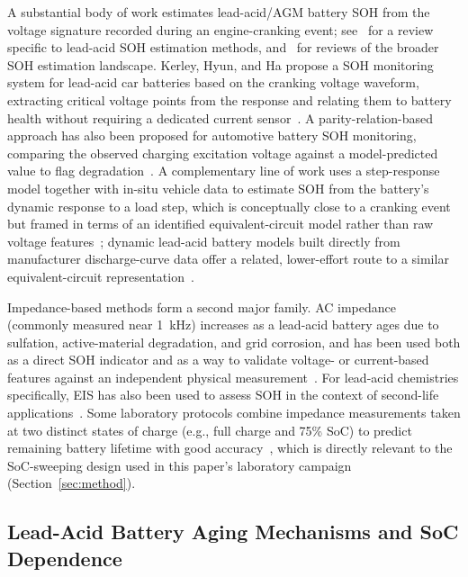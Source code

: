 \documentclass[conference]{IEEEtran}
\begin{document}
A substantial body of work estimates lead-acid/AGM battery SOH from the voltage signature recorded during an engine-cranking event; see~\cite{jiangReviewStateHealth2022} for a review specific to lead-acid SOH estimation methods, and~\cite{nouraReviewBatteryState2020,kimBatteryStateHealth2025} for reviews of the broader SOH estimation landscape. Kerley, Hyun, and Ha propose a SOH monitoring system for lead-acid car batteries based on the cranking voltage waveform, extracting critical voltage points from the response and relating them to battery health without requiring a dedicated current sensor~\cite{kerleyAutomotiveLeadacidBattery2015}. A parity-relation-based approach has also been proposed for automotive battery SOH monitoring, comparing the observed charging excitation voltage against a model-predicted value to flag degradation~\cite{zhangAutomotiveBatteryStateofhealth2012}. A complementary line of work uses a step-response model together with in-situ vehicle data to estimate SOH from the battery's dynamic response to a load step, which is conceptually close to a cranking event but framed in terms of an identified equivalent-circuit model rather than raw voltage features~\cite{stepresponse_soh}; dynamic lead-acid battery models built directly from manufacturer discharge-curve data offer a related, lower-effort route to a similar equivalent-circuit representation~\cite{medoraDynamicBatteryModeling2005}.

Impedance-based methods form a second major family. AC impedance (commonly measured near 1~kHz) increases as a lead-acid battery ages due to sulfation, active-material degradation, and grid corrosion, and has been used both as a direct SOH indicator and as a way to validate voltage- or current-based features against an independent physical measurement~\cite{lead_acid_impedance_aging,eis_soh_timedep,tairovImpedanceMeasurementsBattery2011}. For lead-acid chemistries specifically, EIS has also been used to assess SOH in the context of second-life applications~\cite{mohsinNewLeadacidBattery2022}. Some laboratory protocols combine impedance measurements taken at two distinct states of charge (e.g., full charge and 75\% SoC) to predict remaining battery lifetime with good accuracy~\cite{eis_soh_timedep}, which is directly relevant to the SoC-sweeping design used in this paper's laboratory campaign (Section~\ref{sec:method}).

\subsection{Lead-Acid Battery Aging Mechanisms and SoC Dependence}
\end{document}
